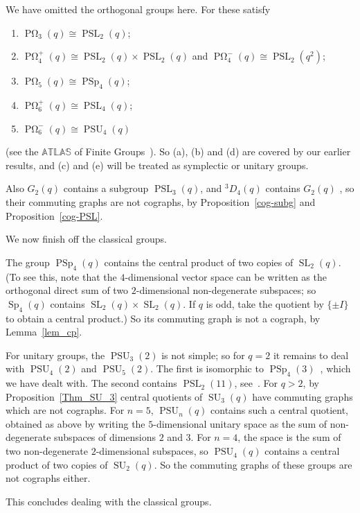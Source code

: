 \documentclass{elsarticle}
\newcommand{\PSL}{\mathop{\mathrm{PSL}}\nolimits}
\newcommand{\SL}{\mathop{\mathrm{SL}}\nolimits}
\newcommand{\PSU}{\mathop{\mathrm{PSU}}\nolimits}
\newcommand{\SU}{\mathop{\mathrm{SU}}\nolimits}
\newcommand{\PSp}{\mathop{\mathrm{PSp}}\nolimits}
\newcommand{\POm}{\mathop{\mathrm{P}\Omega}\nolimits}
\newcommand{\Sp}{\mathop{\mathrm{Sp}}\nolimits}
\begin{document}
We have omitted the orthogonal groups here. For these satisfy
\begin{enumerate}
\item $\POm_3(q)\cong\PSL_2(q)$;
\item $\POm^+_4(q)\cong\PSL_2(q)\times\PSL_2(q)$ and $\POm^-_4(q)\cong\PSL_2(q^2)$;
\item $\POm_5(q)\cong\PSp_4(q)$;
\item $\POm^+_6(q)\cong\PSL_4(q)$;
\item $\POm^-_6(q)\cong\PSU_4(q)$
\end{enumerate}
(see the $\mathbb{ATLAS}$ of Finite Groups~\cite{CC85}). So (a), (b) and (d)
are covered by our earlier results, and (c) and (e) will be treated as symplectic or unitary groups.

Also $G_2(q)$ contains a subgroup $\PSL_3(q)$, and ${}^3D_4(q)$
contains $G_2(q)$ \cite{Cooperstein,Kleidman,Kleidman2}, so their commuting graphs are not cographs, by Proposition~\ref{cog-subg} and Proposition~\ref{cog-PSL}.

We now finish off the classical groups.

The group $\PSp_4(q)$ contains the central product of two copies of
$\SL_2(q)$. (To see this, note that the $4$-dimensional vector space can be
written as the orthogonal direct sum of two $2$-dimensional non-degenerate subspaces; so
$\Sp_4(q)$ contains $\SL_2(q)\times\SL_2(q)$. If $q$ is odd, take the
quotient by $\{\pm I\}$ to obtain a central product.) So its commuting graph
is not a cograph, by Lemma~\ref{lem_cp}.




For unitary groups, the $\PSU_3(2)$ is not simple; so for $q=2$ it remains to deal with $\PSU_4(2)$ and $\PSU_5(2)$. The first is isomorphic to $\PSp_4(3)$~\cite{CC85}, which we have dealt with. The second contains $\PSL_2(11)$, see~\cite{CC85}. For $q>2$, by Proposition~\ref{Thm_SU_3} central quotients of $\SU_3(q)$ have
commuting graphs which are not cographs. For $n=5$, $\PSU_n(q)$ contains such
a central quotient, obtained as above by writing the $5$-dimensional unitary
space as the sum of non-degenerate subspaces of dimensions $2$ and $3$. For
$n=4$, the space is the sum of two non-degenerate $2$-dimensional subspaces,
so $\PSU_4(q)$ contains a central product of two copies of $\SU_2(q)$.  So the
commuting graphs of these groups are not cographs either.


This concludes dealing with the classical groups.

\medskip
\end{document}
